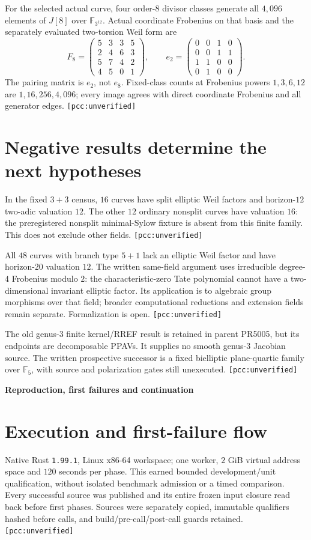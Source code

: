 \documentclass[10pt,a4paper]{article}
\newcommand{\uv}{\texttt{[pcc:unverified]}}
\begin{document}
For the selected actual curve, four order-$8$ divisor classes generate all
$4{,}096$ elements of $J[8]$ over $\mathbb F_{3^{12}}$. Actual coordinate
Frobenius on that basis and the separately evaluated two-torsion Weil form are
\[
 F_8=\begin{pmatrix}5&3&3&5\\2&4&6&3\\5&7&4&2\\4&5&0&1\end{pmatrix},\qquad
 e_2=\begin{pmatrix}0&0&1&0\\0&0&1&1\\1&1&0&0\\0&1&0&0\end{pmatrix}.
\]
The pairing matrix is $e_2$, not $e_8$. Fixed-class counts at Frobenius
powers $1,3,6,12$ are $1,16,256,4{,}096$; every image agrees with direct
coordinate Frobenius and all generator edges. \uv

\section{Negative results determine the next hypotheses}
In the fixed $3+3$ census, $16$ curves have split elliptic Weil factors and
horizon-$12$ two-adic valuation $12$. The other $12$ ordinary nonsplit curves
have valuation $16$: the preregistered nonsplit minimal-Sylow fixture is
absent from this finite family. This does not exclude other fields. \uv

All $48$ curves with branch type $5+1$ lack an elliptic Weil factor and have
horizon-$20$ valuation $12$. The written same-field argument uses irreducible
degree-$4$ Frobenius modulo $2$: the characteristic-zero Tate polynomial
cannot have a two-dimensional invariant elliptic factor. Its application
is to algebraic group morphisms over that field; broader computational
reductions and extension fields remain separate. Formalization is open. \uv

The old genus-$3$ finite kernel/RREF result is retained in parent PR5005,
but its endpoints are decomposable PPAVs. It supplies no smooth genus-$3$
Jacobian source. The written prospective successor is a fixed bielliptic
plane-quartic family over $\mathbb F_5$, with source and polarization gates
still unexecuted. \uv

\newpage
{\Large\bfseries Reproduction, first failures and continuation}\par

\section{Execution and first-failure flow}
Native Rust \texttt{1.99.1}, Linux x86-64 workspace; one worker,
$2$ GiB virtual address space and $120$ seconds per phase.
This earned bounded development/unit qualification, without isolated
benchmark admission or a timed comparison. Every successful source was
published and its entire frozen input closure read back before first phases.
Sources were separately copied, immutable qualifiers hashed before calls,
and build/pre-call/post-call guards retained. \uv
\end{document}
